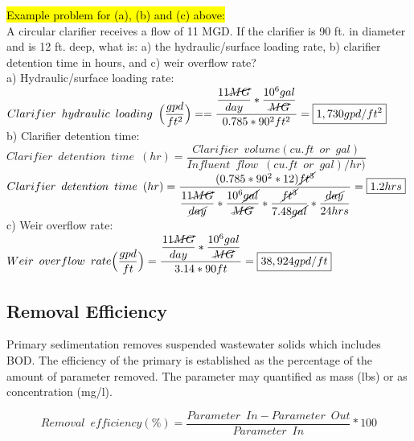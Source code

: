 \hl{Example problem for (a), (b) and (c) above:}\\
		\vspace{0.2cm}
A circular clarifier receives a flow of 11 MGD.  If the clarifier is 90 ft. in diameter and is 12 ft. deep, what is: a) the hydraulic/surface loading rate, b) clarifier detention time in hours, and c) weir overflow rate?\\
		\vspace{0.2cm}
a) Hydraulic/surface loading rate:\\
$Clarifier \enspace hydraulic \enspace loading \enspace 	\Big(\dfrac{gpd}{ft^2}\Big) ==\dfrac{\dfrac{11\cancel{MG}}{{day}}*\dfrac{10^6gal}{\cancel{MG}}}{0.785*90^2 ft^2}=\boxed{1,730gpd/ft^2}$\\
		\vspace{0.5cm}
b) Clarifier detention time:\\
$Clarifier \enspace detention \enspace time \enspace (hr) = 	\dfrac{ Clarifier \enspace volume (cu.ft \enspace or \enspace gal)}{Influent \enspace flow \enspace (cu.ft \enspace or \enspace gal)/hr)}$\\
		\vspace{0.2cm}
$Clarifier \enspace detention \enspace time \enspace (hr) = 	\dfrac{(0.785*90^2*12)\cancel{ft^3}}{\dfrac{11\cancel{MG}}{\cancel{day}}*\dfrac{10^6\cancel{gal}}{\cancel{MG}}*\dfrac{\cancel{ft^3}}{7.48\cancel{gal}}*\dfrac{\cancel{day}}{24hrs}}=\boxed{1.2hrs}$\\
		\vspace{0.5cm}
c) Weir overflow rate:\\
		\vspace{0.2cm} 
$Weir \enspace overflow \enspace rate \Big(\dfrac{gpd}{ft}\Big) =\dfrac{\dfrac{11\cancel{MG}}{{day}}*\dfrac{10^6gal}{\cancel{MG}}}{3.14*90 ft}=\boxed{38,924gpd/ft}$\\

\subsection{Removal Efficiency}		
Primary sedimentation removes suspended wastewater solids which includes BOD.  The efficiency of the primary is established as the percentage of the amount of parameter removed.  The parameter may quantified as mass (lbs) or as concentration (mg/l).

$$Removal \enspace efficiency (\%) = \dfrac{Parameter  \enspace In - Parameter  \enspace Out}{Parameter \enspace In} * 100$$

